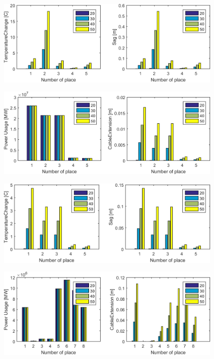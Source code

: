 \documentclass[a4paper]{article}
\begin{document}
\begin{figure}[!h]
\centering
\includegraphics[scale=0.44]{schemas/img7_2.png}
\label{fig:img7_2}
\end{figure}

\begin{figure}[!h]
\centering
\includegraphics[scale=0.44]{schemas/img8_1.png}
\label{fig:img8_1}
\end{figure}

\clearpage

\begin{figure}[!h]
\centering
\includegraphics[scale=0.44]{schemas/img8_2.png}
\label{fig:img8_2}
\end{figure}

\begin{figure}[!h]
\centering
\includegraphics[scale=0.44]{schemas/img9_1.png}
\label{fig:img9_1}
\end{figure}
\end{document}
